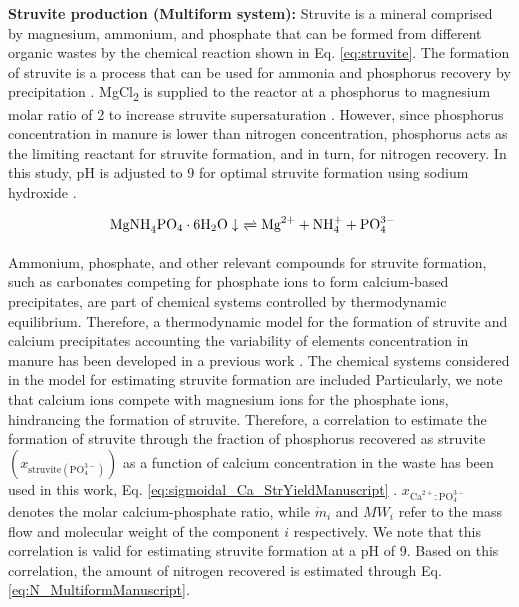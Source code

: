 \begin{refsection}[referencesCh6]
\textbf{Struvite production (Multiform system):} Struvite is a mineral comprised by magnesium, ammonium, and phosphate that can be formed from different  organic wastes by the chemical reaction shown in Eq. \ref{eq:struvite}. The formation of struvite is a process that can be used for ammonia and phosphorus recovery by precipitation \citep{martin2020m}. MgCl\textsubscript{2} is supplied to the reactor at a phosphorus to magnesium molar ratio of 2 to increase struvite supersaturation \citep{bhuiyan2008phosphorus}. However, since phosphorus concentration in manure is lower than nitrogen concentration, phosphorus acts as the limiting reactant for struvite formation, and in turn, for nitrogen recovery. In this study, pH is adjusted to 9 for optimal struvite formation using sodium hydroxide \citep{Tao}.

\begin{align}
	& \text{MgNH}_{4}\text{PO}_{4} \cdot 6\text{H}_{2}\text{O} \downarrow \ \xrightleftharpoons[]{} \text{Mg}^{2+} + \text{NH}_{4}^{+} + \text{PO}_{4}^{3-} \label{eq:struvite}
\end{align}

Ammonium, phosphate, and other relevant compounds for struvite formation, such as carbonates competing for phosphate ions to form calcium-based precipitates, are part of chemical systems controlled by thermodynamic equilibrium. Therefore, a thermodynamic model for the formation of struvite and calcium precipitates accounting the variability of elements concentration in manure has been developed in a previous work \citep{martin2020m}.
The chemical systems considered in the model for estimating struvite formation are included {\color{blue}{in Tables 1S and 2S of the Supplementary Material.}}
Particularly, we note that calcium ions compete with magnesium ions for the phosphate ions, hindrancing the formation of struvite. Therefore, a correlation
to estimate the formation of struvite through the fraction of phosphorus recovered as struvite $\left(x_{\text{struvite} \left(\text{PO}_{4}^{3-}\right) }\right) $ as a function of calcium concentration in the waste has been used in this work, Eq. \ref{eq:sigmoidal_Ca_StrYieldManuscript} \citep{martin2020m}. $x_{\text{Ca}^{2+}:\text{PO}_{4}^{3-}}$ denotes the molar calcium-phosphate ratio, while $\dot{m}_{i}$ and $MW_i$ refer to the mass flow and molecular weight of the component $i$ respectively. We note that this correlation is valid for estimating struvite formation at a pH of 9.
Based on this correlation,
the amount of nitrogen recovered is estimated through Eq. \ref{eq:N_MultiformManuscript}.


\end{refsection}
